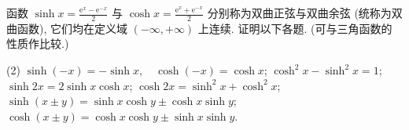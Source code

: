 \begin{exercise}[2.1.18 (旧版教材中的题目)]
    函数 $\sinh x = \frac{\mathrm{e}^x - \mathrm{e}^{-x}}{2}$ 与 $\cosh x = \frac{\mathrm{e}^x + \mathrm{e}^{-x}}{2}$ 分别称为双曲正弦与双曲余弦 (统称为双曲函数), 它们均在定义域 $(-\infty, +\infty)$ 上连续. 证明以下各题. (可与三角函数的性质作比较.)
    \begin{tasks}[label=(\arabic*)](2)
        \task $\sinh(-x) = -\sinh x, \quad \cosh(-x) = \cosh x$;
        \task $\cosh^2 x - \sinh^2 x = 1$;
        \task $\sinh 2x = 2\sinh x \cosh x$;
        \task $\cosh 2x = \sinh^2 x + \cosh^2 x$;
        \task $\sinh(x \pm y) = \sinh x \cosh y \pm \cosh x \sinh y$;
        \task $\cosh(x \pm y) = \cosh x \cosh y \pm \sinh x \sinh y$.
    \end{tasks}
\end{exercise}

